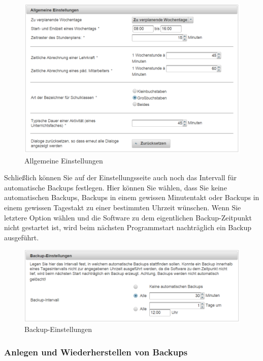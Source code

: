 \documentclass[fontsize=12pt]{scrartcl}
\begin{document}
\begin{figure}[H]
\includegraphics[width=\textwidth]{images/systemSettings2.png}
\caption{Allgemeine Einstellungen}
\end{figure}


Schließlich können Sie auf der Einstellungsseite auch noch das Intervall für automatische Backups festlegen. Hier können Sie wählen, dass Sie keine automatischen Backups, Backups in einem gewissen Minutentakt oder Backups in einem gewissen Tagestakt zu einer bestimmten Uhrzeit wünschen. Wenn Sie letztere Option wählen und die Software zu dem eigentlichen Backup-Zeitpunkt nicht gestartet ist, wird beim nächsten Programmstart nachträglich ein Backup ausgeführt.

 
\begin{figure}[H]
\includegraphics[width=\textwidth]{images/systemSettings3.png}
\caption{Backup-Einstellungen}
\end{figure}

\subsubsection{Anlegen und Wiederherstellen von Backups}
\end{document}
